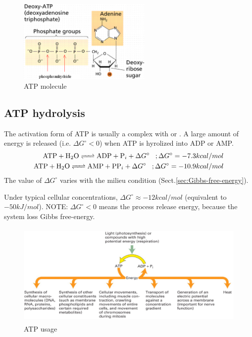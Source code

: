 \begin{figure}[hbt]
  \centerline{\includegraphics[height=4cm,
    angle=0]{./images/ATP.eps}}
\caption{ATP molecule}
\label{fig:ATP}
\end{figure}

\subsection{ATP hydrolysis}
\label{sec:ATP-hydrolysis}

The activation form of ATP is usually a complex with  or . A
large amount of energy is released (i.e. $\Delta G^\circ < 0$) when ATP is
hyrolized into ADP or AMP.
\begin{equation}
  \label{eq:2}
  \begin{split}
    \ce{ATP + H2O <=> ADP + P_i } + \Delta G^{\circ}\;\;\; ; \Delta G^{\circ} = -7.3 kcal/mol\\
    \ce{ATP + H2O <=> AMP + PP_i} + \Delta G^{\circ} \;\;\; ; \Delta G^{\circ} = -10.9 kcal/mol
  \end{split}
\end{equation}
The value of $\Delta G^{\circ}$ varies with the milieu condition
(Sect.\ref{sec:Gibbs-free-energy}).

Under typical cellular concentrations, $\Delta G^{\circ} \approx -12 kcal/mol$
(equivalent to $-50 kJ/mol$). NOTE: $\Delta G^{\circ}<0$ means the process
release energy, because the system loss Gibbs free-energy.




\begin{figure}[hbt]
  \centerline{\includegraphics[height=5cm,
    angle=0]{./images/ATP_usage.eps}}
\caption{ATP usage}
\label{fig:atp}
\end{figure}



